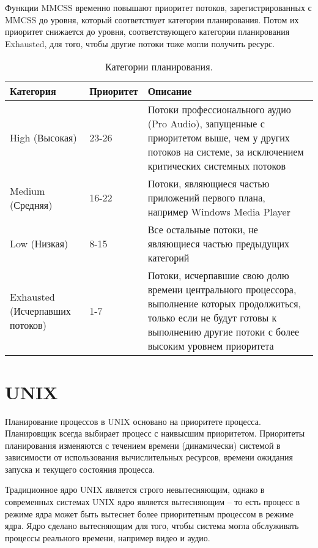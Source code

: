 Функции MMCSS временно повышают приоритет потоков, зарегистрированных с MMCSS до уровня, который соответствует категории планирования. Потом их приоритет снижается до уровня, соответствующего категории планирования Exhausted, для того, чтобы другие потоки тоже могли получить ресурс.
\begin{table}[h]
	\begin{center}
		\captionsetup{justification=raggedright,singlelinecheck=off,margin=2mm}
		\caption{Категории планирования.}
		\captionsetup{justification=raggedright,singlelinecheck=off,margin=2mm}
		\begin{tabular}{|p{40mm}|p{30mm}|p{80mm}|}
			\hline
			\textbf{Категория} & \textbf{Приоритет} & \textbf{Описание} \\
			\hline
			High (Высокая) & 23-26 & Потоки профессионального аудио (Pro Audio), запущенные с приоритетом выше, чем у других потоков на системе, за исключением критических системных потоков \\
			\hline
			Medium (Средняя) & 16-22 & Потоки, являющиеся частью приложений первого плана, например Windows Media Player \\
			\hline
			Low (Низкая) & 8-15 & Все остальные потоки, не являющиеся частью предыдущих категорий \\
			\hline
			Exhausted (Исчерпавших потоков) & 1-7 & Потоки, исчерпавшие свою долю времени центрального процессора, выполнение которых продолжиться, только если не будут готовы к выполнению другие потоки с более высоким уровнем приоритета \\
			\hline
		\end{tabular}
	\end{center}
	\label{tab:plan}
\end{table}
\section{UNIX}

Планирование процессов в UNIX основано на приоритете процесса. Планировщик всегда выбирает процесс с наивысшим приоритетом. Приоритеты планирования изменяются с течением времени (динамически) системой в зависимости от использования вычислительных ресурсов, времени ожидания запуска и текущего состояния процесса. 

Традиционное ядро UNIX является строго невытесняющим, однако в современных системах UNIX ядро является вытесняющим -- то есть процесс в режиме ядра может быть вытеснет более приоритетным процессом в режиме ядра. Ядро сделано вытесняющим для того, чтобы система могла обслуживать процессы реального времени, например видео и аудио.

